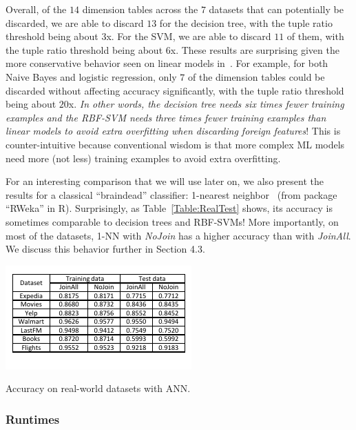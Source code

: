 \documentclass{vldb}
\begin{document}
Overall, of the $14$ dimension tables across the $7$ datasets that can potentially be discarded, we are able to discard $13$ for the decision tree, with 
the tuple ratio threshold being about $3$x. For the SVM, we are able to discard $11$ of them, with the tuple ratio threshold being about $6$x.
These results are surprising given the more conservative behavior seen on linear models in~\cite{hamlet}. For example, for both Naive Bayes and logistic regression, only 
$7$ of the dimension tables could be discarded without affecting accuracy significantly, with the tuple ratio threshold being about $20$x. \textit{In other words, the decision tree
needs six times fewer training examples and the RBF-SVM needs three times fewer training examples than linear models to avoid extra overfitting when discarding foreign features}! 
This is counter-intuitive because conventional wisdom is that more complex ML models need more (not less) training examples to avoid extra overfitting.

For an interesting comparison that we will use later on, we also present the results for a classical ``braindead'' classifier: 1-nearest neighbor~\cite{mitchellbook} (from
package ``RWeka'' in R).
Surprisingly, as Table~\ref{Table:RealTest} shows,  its accuracy is sometimes comparable to decision trees and RBF-SVMs! 
More importantly, on most of the datasets, 1-NN with \textit{NoJoin} has a higher accuracy than with \textit{JoinAll}. We discuss this behavior further in Section 4.3.

\begin{table}[t]
\centering
\includegraphics[width=\columnwidth,height=\textheight,keepaspectratio]{nn_table.pdf}
\caption{Accuracy on real-world datasets with ANN.}
\label{Table:NeuralNet}
\end{table}


\subsubsection*{Runtimes}
\end{document}
